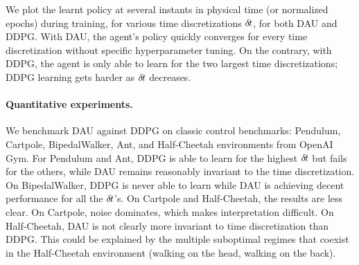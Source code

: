We plot the learnt policy at several instants in physical time (or
normalized epochs) during training, for various time discretizations
${\delta\hspace{-.1em}t}$, for both DAU and DDPG. With DAU, the agent's policy quickly
converges for every time discretization without specific hyperparameter
tuning. On the contrary, with DDPG, the agent is only able to learn for
the two largest time discretizations; DDPG learning gets harder as ${\delta\hspace{-.1em}t}$ decreases.

\paragraph{Quantitative experiments.}
We benchmark DAU against DDPG on classic control benchmarks: Pendulum,
Cartpole, BipedalWalker, Ant, and Half-Cheetah environments from OpenAI
Gym. For Pendulum and Ant, DDPG is able to learn for the highest
${\delta\hspace{-.1em}t}$ but fails for the others, while DAU remains reasonably
invariant to the time discretization. On BipedalWalker, DDPG is never
able to learn while DAU is achieving decent performance for all the
${\delta\hspace{-.1em}t}$'s. On Cartpole and Half-Cheetah, the results are less clear. On
Cartpole, noise dominates, which makes interpretation difficult. On Half-Cheetah, DAU is not clearly more invariant to time discretization than
DDPG. This could be explained by the multiple suboptimal regimes that
coexist in the Half-Cheetah environment (walking on the head, walking on
the back). 


% 


